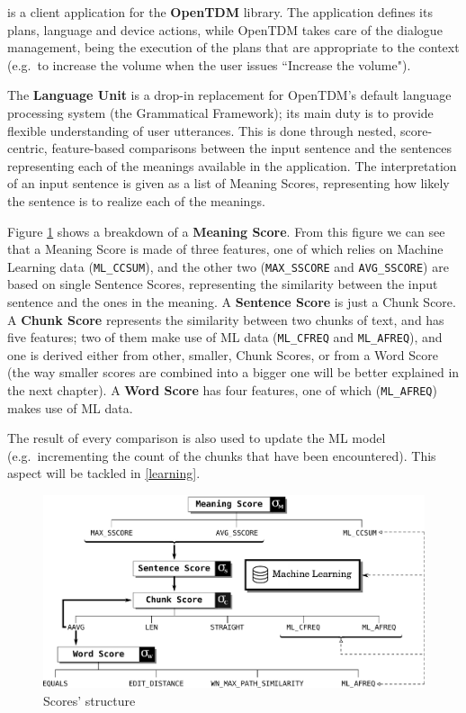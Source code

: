 \pname is a client application for the \textbf{OpenTDM} library. The application defines its plans, language and device actions, while OpenTDM takes care of the dialogue management, being the execution of the plans that are appropriate to the context (e.g.\ to increase the volume when the user issues ``Increase the volume").

The \textbf{Language Unit} is a drop-in replacement for OpenTDM's default language processing system (the Grammatical Framework); its main duty is to provide flexible understanding of user utterances. This is done through nested, score-centric, feature-based comparisons between the input sentence and the sentences representing each of the meanings available in the application. The interpretation of an input sentence is given as a list of Meaning Scores, representing how likely the sentence is to realize each of the meanings.

Figure \ref{scoresbreakdown} shows a breakdown of a \textbf{Meaning Score}. From this figure we can see that a Meaning Score is made of three features, one of which relies on Machine Learning data (\texttt{ML\_CCSUM}), and the other two (\texttt{MAX\_SSCORE} and \texttt{AVG\_SSCORE}) are based on single Sentence Scores, representing the similarity between the input sentence and the ones in the meaning. A \textbf{Sentence Score} is just a Chunk Score. A \textbf{Chunk Score} represents the similarity between two chunks of text, and has five features; two of them make use of ML data (\texttt{ML\_CFREQ} and \texttt{ML\_AFREQ}), and one is derived either from other, smaller, Chunk Scores, or from a Word Score (the way smaller scores are combined into a bigger one will be better explained in the next chapter). A \textbf{Word Score} has four features, one of which (\texttt{ML\_AFREQ}) makes use of ML data.

The result of every comparison is also used to update the ML model (e.g.\ incrementing the count of the chunks that have been encountered). This aspect will be tackled in \ref{learning}.


\begin{figure}
\includegraphics[width=23cm]{Pictures/scores_diagram.pdf}
\caption{Scores' structure}
\label{scoresbreakdown}
\end{figure}